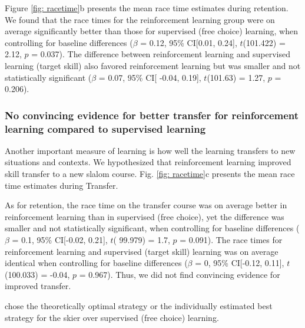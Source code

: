 Figure \ref{fig: racetime}b presents the mean race time estimates during retention. We found that the race times for the reinforcement learning group were on average significantly better than those for supervised (free choice) learning, when controlling for baseline differences ($\beta$ = 0.12, 95\% CI[0.01, 0.24], $t$(101.422) = 2.12, $p$ = 0.037). The difference between reinforcement learning and supervised learning (target skill) also favored reinforcement learning but was smaller and not statistically significant ($\beta$ = 0.07, 95\% CI[ -0.04, 0.19], $t$(101.63) = 1.27, $p$ = 0.206). 


\subsubsection{No convincing evidence for better transfer for reinforcement learning compared to supervised learning} \label{result_racetime_transfer}
Another important measure of learning is how well the learning transfers to new situations and contexts. We hypothesized that reinforcement learning improved skill transfer to a new slalom course. Fig. \ref{fig: racetime}c presents the mean race time estimates during Transfer.

As for retention, the race time on the transfer course was on average better in reinforcement learning than in supervised (free choice), yet the difference was smaller and not statistically significant, when controlling for baseline differences ($\beta$ = 0.1, 95\% CI[-0.02, 0.21], $t$( 99.979) = 1.7, $p$  = 0.091). The race times for reinforcement learning and supervised (target skill) learning was on average identical when controlling for baseline differences ($\beta$ = 0, 95\% CI[-0.12, 0.11], $t$(100.033) = -0.04, $p$ = 0.967). Thus, we did not find convincing evidence for improved transfer.



chose the theoretically optimal strategy or the individually estimated best strategy for the skier over supervised (free choice) learning.

 





